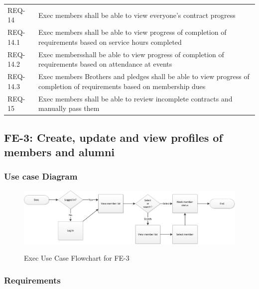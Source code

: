 \documentclass{article}
\newcommand{\req}[1]{REQ-{#1}}
\begin{document}
\FloatBarrier
\newpage
\FloatBarrier
\begin{tabular}{lp{8cm}}
\req{14} & Exec members shall be able to view everyone's contract
progress \\
\req{14.1} & Exec members shall be able to view progress of completion
of requirements based
on service hours completed\\
\req{14.2} & Exec membersshall be able to view progress of completion
of requirements based
on attendance at events\\
\req{14.3} & Exec members  Brothers and pledges shall be able to view progress of completion
of requirements based
on membership dues\\
\req{15} & Exec members shall be able to review incomplete contracts
and manually pass them 
\\
\end{tabular}

\subsection{FE-3: Create, update and view profiles of members and
  alumni}

\subsubsection{Use case Diagram}

\newpage

\FloatBarrier
\begin{figure}
\centering
\caption{Exec Use Case Flowchart for FE-3}
\includegraphics[scale=.75]{img/execUseCaseFE3.png}
\label{fig:execUseCaseFE3}
\end{figure}
\FloatBarrier

\newpage

\subsubsection{Requirements}
\end{document}
